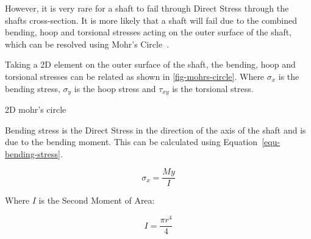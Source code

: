 However, it is very rare for a shaft to fail through Direct Stress through the shafts cross-section. It is more likely that a shaft will fail due to the combined bending, hoop and torsional stresses acting on the outer surface of the shaft, which can be resolved using Mohr's Circle~\cite{clifford2012}.

Taking  a 2D element on the outer surface of the shaft, the bending, hoop and torsional stresses can be related as shown in \cref{fig-mohrs-circle}. Where $\sigma_x$ is the bending stress, $\sigma_y$ is the hoop stress and $\tau_{xy}$ is the torsional stress.

\begin{marginfigure}
  \center{}
  \caption{2D mohr's circle}
  \label{fig-mohrs-circle}
\end{marginfigure}

Bending  stress is the Direct Stress in the direction of the axis of the shaft and is due to the bending moment. This can be calculated using Equation~\ref{equ-bending-stress}.

\begin{equation}
  \sigma_{x} = \frac{My}{I}
  \label{equ-bending-stress}
\end{equation}

Where \(I\) is the Second Moment of Area:

\begin{equation}
  I = \frac{\pi r^4}{4}
\end{equation}

